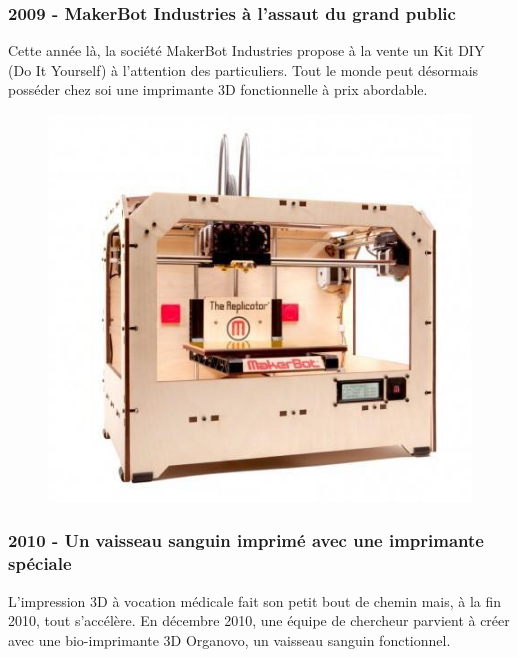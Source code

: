 \documentclass{article}
\begin{document}
\subsubsection{2009 - MakerBot Industries à l'assaut du grand public}
Cette année là, la société MakerBot Industries propose à la vente un Kit DIY (Do It Yourself) à l'attention des particuliers. Tout le monde peut désormais posséder chez soi une imprimante 3D fonctionnelle à prix abordable.
\begin{figure}[h!]
\centering
\includegraphics[scale=0.35]{./images/the-replicator.jpg}
\end{figure}
\newpage
\subsubsection{2010 - Un vaisseau sanguin imprimé avec une imprimante spéciale}
L'impression 3D à vocation médicale fait son petit bout de chemin mais, à la fin 2010, tout s'accélère. En décembre 2010, une équipe de chercheur parvient à créer avec une bio-imprimante 3D Organovo, un vaisseau sanguin fonctionnel.
\end{document}
